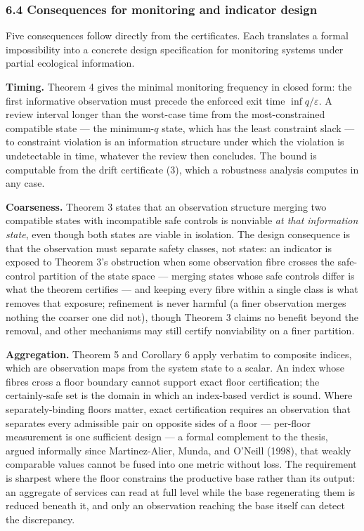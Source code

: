 \documentclass[11pt]{article}
\begin{document}
\subsubsection{6.4 Consequences for monitoring and indicator
design}\label{consequences-for-monitoring-and-indicator-design}

Five consequences follow directly from the certificates. Each translates
a formal impossibility into a concrete design specification for
monitoring systems under partial ecological information.

\textbf{Timing.} Theorem 4 gives the minimal monitoring frequency in
closed form: the first informative observation must precede the enforced
exit time \(\inf q / \varepsilon\). A review interval longer than the
worst-case time from the most-constrained compatible state --- the
minimum-\(q\) state, which has the least constraint slack --- to
constraint violation is an information structure under which the
violation is undetectable in time, whatever the review then concludes.
The bound is computable from the drift certificate (3), which a robustness analysis computes in any case.

\textbf{Coarseness.} Theorem 3 states that an observation structure
merging two compatible states with incompatible safe controls is
nonviable \emph{at that information state}, even though both states are
viable in isolation. The design consequence is that the observation must
separate safety classes, not states: an indicator is exposed to Theorem
3's obstruction when some observation fibre crosses the safe-control
partition of the state space --- merging states whose safe controls
differ is what the theorem certifies --- and keeping every fibre within
a single class is what removes that exposure; refinement is never harmful (a finer observation merges nothing the coarser one did not), though Theorem 3
claims no benefit beyond the removal, and other mechanisms may still
certify nonviability on a finer partition.

\textbf{Aggregation.} Theorem 5 and Corollary 6 apply verbatim to
composite indices, which are observation maps from the system state to a
scalar. An index whose fibres cross a floor boundary cannot support
exact floor certification; the certainly-safe set is the domain in which an index-based verdict is sound. Where separately-binding floors matter, exact
certification requires an observation that separates every admissible
pair on opposite sides of a floor --- per-floor measurement is one
sufficient design --- a formal complement to the thesis, argued informally since Martinez-Alier, Munda, and O'Neill (1998), that weakly comparable
values cannot be fused into one metric without loss. The requirement is
sharpest where the floor constrains the productive base rather than its
output: an aggregate of services can read at full level while the base
regenerating them is reduced beneath it, and only an observation
reaching the base itself can detect the discrepancy.
\end{document}
